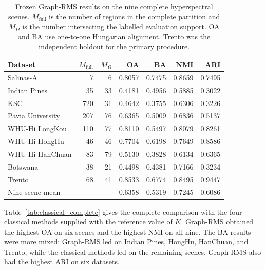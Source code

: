 \documentclass[10pt,a4paper,fleqn]{article}
\begin{document}
\begin{table}[!t]
\centering
\small
\caption{Frozen Graph-RMS results on the nine complete hyperspectral scenes.
\(M_{\mathrm{full}}\) is the number of regions in the complete partition and
\(M_{\Omega}\) is the number intersecting the labelled evaluation support.
OA and BA use one-to-one Hungarian alignment. Trento was the independent
holdout for the primary procedure.}
\label{tab:primary_results}

\renewcommand{\arraystretch}{1.05}
\setlength{\tabcolsep}{4.5pt}

\begin{tabular}{@{}lrrrrrr@{}}
\toprule
Dataset &
\(M_{\mathrm{full}}\) &
\(M_{\Omega}\) &
OA &
BA &
NMI &
ARI \\
\midrule
Salinas-A          & 7   & 6  & 0.8057 & 0.7475 & 0.8659 & 0.7495 \\
Indian Pines       & 35  & 33 & 0.4181 & 0.4956 & 0.5885 & 0.3022 \\
KSC                & 720 & 31 & 0.4642 & 0.3755 & 0.6306 & 0.3226 \\
Pavia University   & 207 & 76 & 0.6365 & 0.5009 & 0.6836 & 0.5137 \\
WHU-Hi LongKou     & 110 & 77 & 0.8110 & 0.5497 & 0.8079 & 0.8261 \\
WHU-Hi HongHu      & 46  & 46 & 0.7704 & 0.6198 & 0.7649 & 0.8586 \\
WHU-Hi HanChuan    & 83  & 79 & 0.5130 & 0.3828 & 0.6134 & 0.6365 \\
Botswana           & 38  & 21 & 0.4498 & 0.4381 & 0.7166 & 0.3234 \\
Trento             & 68  & 41 & 0.8533 & 0.6774 & 0.8495 & 0.9447 \\
\midrule
Nine-scene mean    & --  & -- & 0.6358 & 0.5319 & 0.7245 & 0.6086 \\
\bottomrule
\end{tabular}
\end{table}

Table~\ref{tab:classical_complete} gives the complete comparison with the four
classical methods supplied with the reference value of \(K\). Graph-RMS
obtained the highest OA on six scenes and the highest NMI on all nine. The BA
results were more mixed: Graph-RMS led on Indian Pines, HongHu, HanChuan, and
Trento, while the classical methods led on the remaining scenes. Graph-RMS
also had the highest ARI on six datasets.
\end{document}
